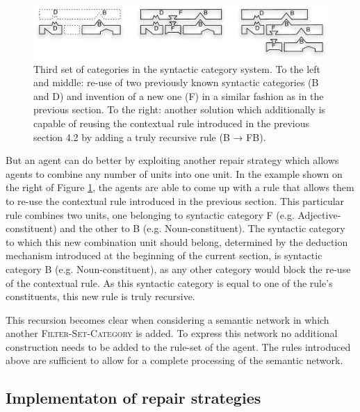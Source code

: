 \begin{figure}[htbp]
  \begin{center}
    \includegraphics[width=\textwidth]{./composition/figures/mapping-3.pdf}
    \caption[Third set of categories in the syntactic category
    system]{Third set of categories in the syntactic category system. To
      the left and middle: re-use of two previously known syntactic
      categories (B and D) and invention of a new one (F) in a similar
      fashion as in the previous section. To the right: another
      solution which additionally is capable of reusing the contextual
      rule introduced in the previous section 4.2 by adding a truly
      recursive rule (B → FB).}
    \label{f:map-syntactic-categories-3}
  \end{center}
\end{figure}

But an agent can do better by exploiting another repair strategy
which allows agents to combine any number of units into one unit. In
the example shown on the right of Figure
\ref{f:map-syntactic-categories-3}, the agents are able to come up
with a rule that allows them to re-use the contextual rule introduced
in the previous section. This particular rule combines two units, one
belonging to syntactic category F (e.g. Adjective-constituent) and the
other to B (e.g. Noun-constituent). The syntactic category to which
this new combination unit should belong, determined by the deduction
mechanism introduced at the beginning of the current section, is
syntactic category B (e.g. Noun-constituent), as any other category
would block the re-use of the contextual rule. As this syntactic
category is equal to one of the rule's constituents, this new rule is
truly recursive.

This recursion becomes clear when considering a semantic network in
which another \textsc{Filter-Set-Category} is added. To express this
network no additional construction needs to be added to the rule-set of
the agent. The rules introduced above are sufficient to allow for a
complete processing of the semantic network.

\subsection{Implementaton of repair strategies}
\label{s:irl-fcg-repair-strategies}

